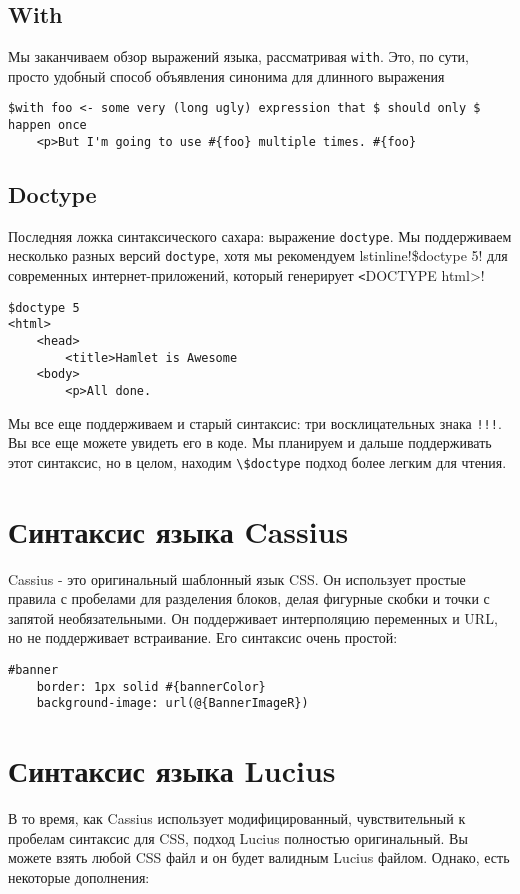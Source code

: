 \subsection{With}

Мы заканчиваем обзор выражений языка, рассматривая \texttt{with}. Это, по сути,
просто удобный способ объявления синонима для длинного выражения

\begin{lstlisting}
$with foo <- some very (long ugly) expression that $ should only $ happen once
    <p>But I'm going to use #{foo} multiple times. #{foo}
\end{lstlisting}

\subsection{Doctype}
Последняя ложка синтаксического сахара: выражение \texttt{doctype}. Мы
поддерживаем несколько разных версий \texttt{doctype}, хотя мы рекомендуем
lstinline!\$doctype 5! для современных интернет-приложений, который генерирует
\lstinline!<!DOCTYPE html>!

\begin{lstlisting}
$doctype 5
<html>
    <head>
        <title>Hamlet is Awesome
    <body>
        <p>All done.
\end{lstlisting}

Мы все еще поддерживаем и старый синтаксис: три восклицательных знака \texttt{!!!}.
Вы все еще можете увидеть его в коде. Мы планируем и дальше поддерживать этот
синтаксис, но в целом, находим \lstinline!\$doctype! подход более легким для чтения.

\section{Синтаксис языка Cassius}
Cassius - это оригинальный шаблонный язык CSS. Он использует простые правила
с пробелами для разделения блоков, делая фигурные скобки и точки с запятой 
необязательными. Он поддерживает интерполяцию переменных и URL, но не поддерживает
встраивание. Его синтаксис очень простой:

\begin{lstlisting}
#banner
    border: 1px solid #{bannerColor}
    background-image: url(@{BannerImageR})
\end{lstlisting}

\section{Синтаксис языка Lucius}
В то время, как Cassius использует модифицированный, чувствительный к пробелам 
синтаксис для CSS, подход Lucius полностью оригинальный. Вы можете взять любой CSS
файл и он будет валидным Lucius файлом. Однако, есть некоторые дополнения:

